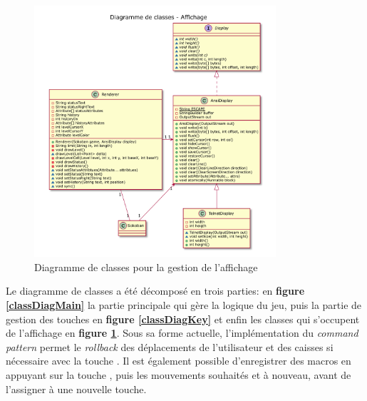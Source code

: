 \documentclass[french]{article}
\begin{document}
	\begin{figure}[H]
		\includegraphics[width=0.8\textwidth]{affichage}
		\caption{Diagramme de classes pour la gestion de l'affichage}
		\label{classDiagDisplay}
	\end{figure}
	
	Le diagramme de classes a été décomposé en trois parties: en \textbf{figure \ref{classDiagMain}} la partie principale qui gère la logique du jeu, puis la partie de gestion des touches en \textbf{figure \ref{classDiagKey}} et enfin les classes qui s'occupent de l'affichage en \textbf{figure \ref{classDiagDisplay}}. Sous sa forme actuelle, l'implémentation du \textit{command pattern} permet le \textit{rollback} des déplacements de l'utilisateur et des caisses si nécessaire avec la touche . Il est également possible d'enregistrer des macros en appuyant sur la touche , puis les mouvements souhaités et  à nouveau, avant de l'assigner à une nouvelle touche.
\end{document}
